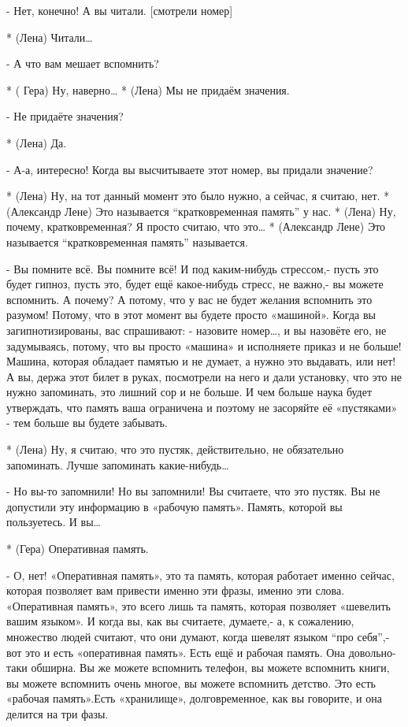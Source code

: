 - Нет, конечно! А вы читали. [смотрели номер]

* (Лена) Читали…

- А что вам мешает вспомнить?

* ( Гера) Ну, наверно…
* (Лена) Мы не придаём значения.

- Не придаёте значения?

* (Лена) Да.

- А-а, интересно! Когда вы высчитываете этот номер, вы придали значение?

* (Лена) Ну, на тот данный момент это было нужно, а сейчас, я считаю, нет.
* (Александр Лене) Это называется “кратковременная память” у нас.
* (Лена) Ну, почему, кратковременная? Я просто считаю, что это…
* (Александр Лене) Это называется “кратковременная память” называется.

- Вы помните всё. Вы помните всё! И под каким-нибудь стрессом,- пусть это будет гипноз, пусть это, будет ещё какое-нибудь стресс, не важно,- вы можете вспомнить. А почему? А потому, что у вас не будет желания вспомнить это разумом! Потому, что в этот момент вы будете просто «машиной». Когда вы загипнотизированы, вас спрашивают: - назовите номер…, и вы назовёте его, не задумываясь, потому, что вы просто «машина» и исполняете приказ и не больше! Машина, которая обладает памятью и не думает, а нужно это выдавать, или нет! А вы, держа этот билет в руках, посмотрели на него и дали установку, что это не нужно запоминать, это лишний сор и не больше. И чем больше наука будет утверждать, что память ваша ограничена и поэтому не засоряйте её «пустяками» - тем больше вы будете забывать. 

* (Лена) Ну, я считаю, что это пустяк, действительно, не обязательно запоминать. Лучше запоминать какие-нибудь…

- Но вы-то запомнили! Но вы запомнили! Вы считаете, что это пустяк. Вы не допустили эту информацию в «рабочую память». Память, которой вы пользуетесь. И вы…

* (Гера) Оперативная память.

- О,  нет! «Оперативная память», это та память, которая работает именно сейчас, которая позволяет вам привести именно эти фразы, именно эти слова. «Оперативная память», это всего лишь та память, которая позволяет «шевелить вашим языком». И когда вы, как вы считаете, думаете,- а, к сожалению, множество людей считают, что они думают, когда шевелят языком “про себя”,-  вот это и есть «оперативная память». Есть ещё и рабочая память. Она довольно-таки обширна. Вы же можете вспомнить телефон, вы можете вспомнить книги, вы можете вспомнить очень многое, вы можете вспомнить детство. Это есть «рабочая память».Есть «хранилище», долговременное, как вы говорите, и она  делится на три фазы.

